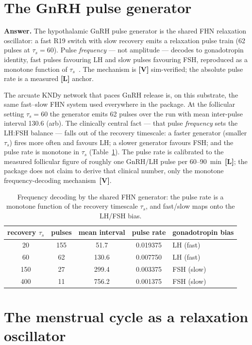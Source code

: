 \documentclass[11pt]{article}
\newcommand{\gradeV}{\textcolor{verified}{\textbf{[V]}}}
\newcommand{\gradeL}{\textcolor{verified}{\textbf{[L]}}}
\begin{document}
\section{The GnRH pulse generator}

\textbf{Answer.} The hypothalamic GnRH pulse generator is the shared FHN relaxation oscillator: a fast R19
switch with slow recovery emits a relaxation pulse train (62 pulses at $\tau_s=60$).
Pulse \emph{frequency} --- not amplitude --- decodes to gonadotropin identity, fast pulses favouring LH and
slow pulses favouring FSH, reproduced as a monotone function of $\tau_s$~\cite{knobil}. The mechanism is
\gradeV{} sim-verified; the absolute pulse rate is a measured \gradeL{} anchor.

The arcuate KNDy network that paces GnRH release is, on this substrate, the same fast--slow FHN system used
everywhere in the package. At the follicular setting $\tau_s=60$ the generator emits 62
pulses over the run with mean inter-pulse interval 130.6 (arb). The
clinically central fact --- that pulse \emph{frequency} sets the LH:FSH balance --- falls out of the recovery
timescale: a faster generator (smaller $\tau_s$) fires more often and favours LH; a slower generator favours
FSH; and the pulse rate is monotone in $\tau_s$ (Table~\ref{tab:freq}). The pulse rate is calibrated to the
measured follicular figure of roughly one GnRH/LH pulse per 60--90~min~\gradeL{}; the package does not claim
to derive that clinical number, only the monotone frequency-decoding mechanism~\gradeV{}.

\begin{table}[H]
\centering
\small
\caption{Frequency decoding by the shared FHN generator: the pulse rate is a monotone function of the recovery timescale $\tau_s$, and fast/slow maps onto the LH/FSH bias.}
\label{tab:freq}
\begin{tabular}{ccccl}
\toprule
recovery $\tau_s$ & pulses & mean interval & pulse rate & gonadotropin bias \\
\midrule
20 & 155 & 51.7 & 0.019375 & LH (fast) \\
60 & 62 & 130.6 & 0.007750 & LH (fast) \\
150 & 27 & 299.4 & 0.003375 & FSH (slow) \\
400 & 11 & 756.2 & 0.001375 & FSH (slow) \\
\bottomrule
\end{tabular}
\end{table}

\section{The menstrual cycle as a relaxation oscillator}
\end{document}
